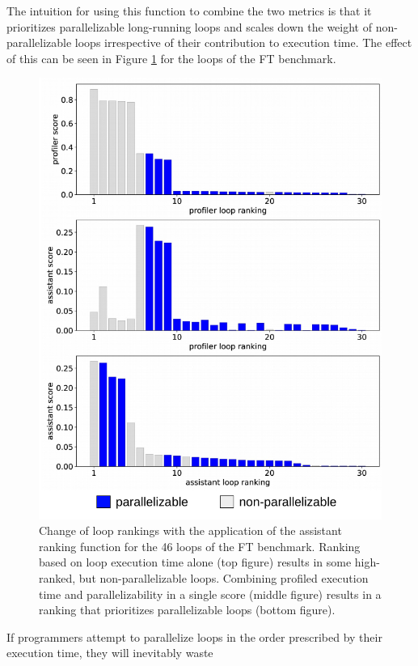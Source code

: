 The intuition for using this function to combine the two metrics is that it prioritizes parallelizable long-running loops and scales down the weight of non-parallelizable loops irrespective of their contribution to execution time. The effect of this can be seen in Figure \ref{fig:ft_loop_ranking} for the loops of the FT benchmark.
\begin{figure}[htb!]
\includegraphics[width=1.0\textwidth]{images/ft_filter.pdf}
\caption{Change of loop rankings with the application of the assistant ranking function for the 46 loops of the FT benchmark. Ranking based on loop execution time alone (top figure) results in some high-ranked, but non-parallelizable loops. Combining profiled execution time and parallelizability in a single score (middle figure) results in a ranking that prioritizes parallelizable loops (bottom figure).}
\label{fig:ft_loop_ranking}
\end{figure}
If programmers attempt to parallelize loops in the order prescribed by their execution time, they will inevitably waste

